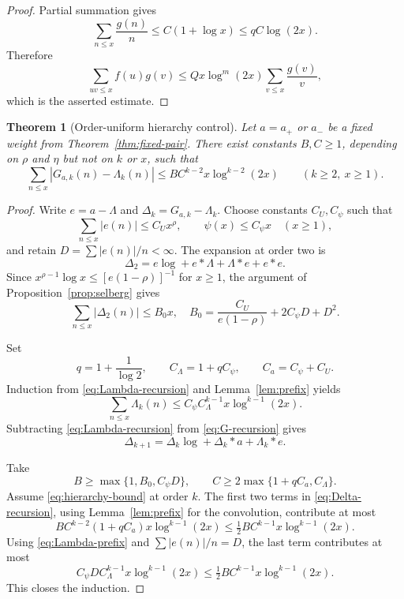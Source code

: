 \documentclass[11pt,a4paper]{amsart}
\newtheorem{theorem}{Theorem}[section]
\theoremstyle{definition}
\newcommand{\1}{\mathbf 1}
\begin{document}
\begin{proof}
Partial summation gives
\[
 \sum_{n\le x}\frac{g(n)}n\le C(1+\log x)
 \le qC\log(2x).
\]
Therefore
\[
 \sum_{uv\le x}f(u)g(v)
 \le Qx\log^m(2x)\sum_{v\le x}\frac{g(v)}v,
\]
which is the asserted estimate.
\end{proof}

\begin{theorem}[Order-uniform hierarchy control]\label{thm:hierarchy}
Let $a=a_+$ or $a_-$ be a fixed weight from Theorem~\ref{thm:fixed-pair}.  There exist constants $B,C\ge1$, depending on $\rho$ and $\eta$ but not on $k$ or $x$, such that
\begin{equation}\label{eq:hierarchy-bound}
 \sum_{n\le x}|G_{a,k}(n)-\Lambda_k(n)|
 \le BC^{k-2}x\log^{k-2}(2x)
 \qquad(k\ge2,\ x\ge1).
\end{equation}
\end{theorem}

\begin{proof}
Write $e=a-\Lambda$ and
$\Delta_k=G_{a,k}-\Lambda_k$.  Choose constants $C_U,C_\psi$ such that
\[
 \sum_{n\le x}|e(n)|\le C_Ux^\rho,
 \qquad
 \psi(x)\le C_\psi x
 \quad(x\ge1),
\]
and retain $D=\sum|e(n)|/n<\infty$.  The expansion at order two is
\[
 \Delta_2=e\log+e*\Lambda+\Lambda*e+e*e.
\]
Since
$x^{\rho-1}\log x\le[e(1-\rho)]^{-1}$ for $x\ge1$, the argument of
Proposition~\ref{prop:selberg} gives
\begin{equation}\label{eq:base-B0}
 \sum_{n\le x}|\Delta_2(n)|\le B_0x,
 \quad
 B_0=\frac{C_U}{e(1-\rho)}+2C_\psi D+D^2.
\end{equation}

Set
\[
 q=1+\frac1{\log2},
 \qquad C_\Lambda=1+qC_\psi,
 \qquad C_a=C_\psi+C_U.
\]
Induction from \eqref{eq:Lambda-recursion} and Lemma~\ref{lem:prefix} yields
\begin{equation}\label{eq:Lambda-prefix}
 \sum_{n\le x}\Lambda_k(n)
 \le C_\psi C_\Lambda^{k-1}x\log^{k-1}(2x).
\end{equation}
Subtracting \eqref{eq:Lambda-recursion} from \eqref{eq:G-recursion} gives
\begin{equation}\label{eq:Delta-recursion}
 \Delta_{k+1}=\Delta_k\log+\Delta_k*a+\Lambda_k*e.
\end{equation}

Take
\[
 B\ge\max\{1,B_0,C_\psi D\},
 \qquad
 C\ge2\max\{1+qC_a,C_\Lambda\}.
\]
Assume \eqref{eq:hierarchy-bound} at order $k$.  The first two terms in
\eqref{eq:Delta-recursion}, using Lemma~\ref{lem:prefix} for the convolution, contribute at most
\[
 B C^{k-2}(1+qC_a)x\log^{k-1}(2x)
 \le\tfrac12BC^{k-1}x\log^{k-1}(2x).
\]
Using \eqref{eq:Lambda-prefix} and $\sum|e(n)|/n=D$, the last term contributes at most
\[
 C_\psi D C_\Lambda^{k-1}x\log^{k-1}(2x)
 \le\tfrac12BC^{k-1}x\log^{k-1}(2x).
\]
This closes the induction.
\end{proof}
\end{document}
